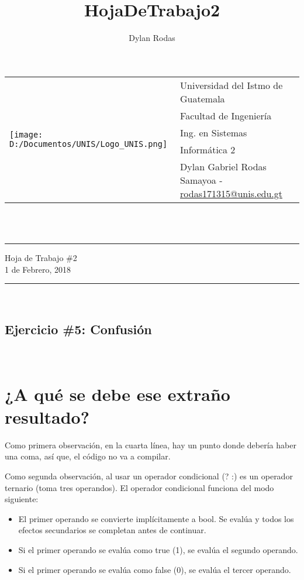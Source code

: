 \documentclass[10pt,a4paper]{article}
\author{Dylan Rodas}
\title{HojaDeTrabajo2}
\newcommand{\horrule}[1]{\rule{\linewidth}{#1}}
\begin{document}
	\begin{tabular}{l l}
     \multirow{5}{*}{\texttt{[image: D:/Documentos/UNIS/Logo\_UNIS.png]}} & Universidad del Istmo de Guatemala \\
     & Facultad de Ingenier\'ia \\
     & Ing. en Sistemas \\
     & Inform\'atica 2 \\
     & Dylan Gabriel Rodas Samayoa - \href{mailto:rodas171315@unis.edu.gt}{rodas171315@unis.edu.gt} \\
    \end{tabular}
	\\\    
	
    \begin{center}
        \horrule{0.5pt}
        \huge{Hoja de Trabajo \#2} \\
        \large{1 de Febrero, 2018} \\
        \horrule{1pt}
	\end{center}
	\
	\begin{center}
	\section*{Ejercicio \#5: Confusi\'on}
	\end{center}
	\
	\section*{¿A qu\'e se debe ese extraño resultado?}

\item{Como primera observaci\'on, en la cuarta l\'inea, hay un punto donde deber\'ia haber una coma, as\'i que, el c\'odigo no va a compilar.}
\item{Como segunda observaci\'on, al usar un operador condicional (? :) es un operador ternario (toma tres operandos). El operador condicional funciona del modo siguiente:}

	\begin{itemize}
\item{El primer operando se convierte implícitamente a bool. Se evalúa y todos los efectos secundarios se completan antes de continuar.}
\item{Si el primer operando se evalúa como true (1), se evalúa el segundo operando.}
\item{Si el primer operando se evalúa como false (0), se evalúa el tercer operando.}
    \end{itemize}
\end{document}
